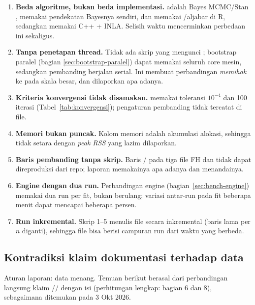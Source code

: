 \begin{enumerate}[label=\arabic*.]
  \item \textbf{Beda algoritme, bukan beda implementasi.}  adalah
        Bayes MCMC/Stan \citep{denicolo2024tipsae},  memakai
        pendekatan Bayesnya sendiri,  dan  memakai
        /aljabar  di R, sedangkan  memakai
        C++ + INLA. Selisih waktu mencerminkan perbedaan ini sekaligus.
  \item \textbf{Tanpa penetapan thread.} Tidak ada skrip yang mengunci
        ; bootstrap paralel (bagian
        \ref{sec:bootstrap-paralel}) dapat memakai seluruh core mesin,
        sedangkan pembanding berjalan serial. Ini membuat perbandingan
        \emph{memihak} ke  pada skala besar, dan dilaporkan apa
        adanya.
  \item \textbf{Kriteria konvergensi tidak disamakan.}  memakai
        toleransi $10^{-4}$ dan 100 iterasi (Tabel~\ref{tab:konvergensi});
        pengaturan pembanding tidak tercatat di file.
  \item \textbf{Memori bukan puncak.} Kolom memori adalah akumulasi alokasi,
        sehingga tidak setara dengan \emph{peak RSS} yang lazim dilaporkan.
  \item \textbf{Baris pembanding tanpa skrip.} Baris /
        pada tiga file FH dan  tidak dapat
        direproduksi dari repo; laporan memakainya apa adanya dan
        menandainya.
  \item \textbf{Engine dengan dua run.} Perbandingan engine
        (bagian~\ref{sec:bench-engine}) memakai dua run per fit, bukan
         berulang; variasi antar-run pada fit beberapa
        menit dapat mencapai beberapa persen.
  \item \textbf{Run inkremental.} Skrip 1--5 menulis file secara inkremental
        (baris lama per $n$ diganti), sehingga file bisa berisi campuran run
        dari waktu yang berbeda.
\end{enumerate}

\subsection{Kontradiksi klaim dokumentasi terhadap data}\label{sec:kontradiksi}

Aturan laporan: data menang. Temuan berikut berasal dari perbandingan langsung
klaim //
dengan isi  (perhitungan lengkap:
 bagian 6 dan 8), sebagaimana ditemukan
pada 3 Okt 2026.

